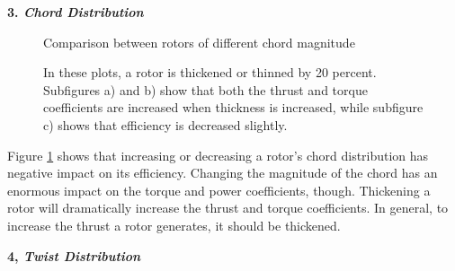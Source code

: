 \documentclass{article}
\begin{document}
\textbf{3. \emph{Chord Distribution}} \newline

\begin{figure}
  \centering
  \caption{Comparison between rotors of different chord magnitude}
  \captionsetup{aboveskip=0pt,font=it}
  \caption*{In these plots, a rotor is thickened or thinned by 20 percent. Subfigures a) and b) show that both the thrust and torque coefficients are increased when thickness is increased, while subfigure c) shows that efficiency is decreased slightly.}
  \label{fig:5}
\end{figure}

Figure \ref{fig:5} shows that increasing or decreasing a rotor's chord distribution has negative impact on its efficiency. Changing the magnitude of the chord has an enormous impact on the torque and power coefficients, though. Thickening a rotor will dramatically increase the thrust and torque coefficients. In general, to increase the thrust a rotor generates, it should be thickened. \newline

\textbf{4, \emph{Twist Distribution}} \newline
\end{document}
